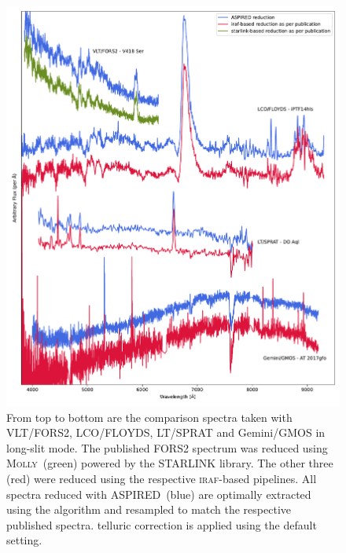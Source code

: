 \documentclass[linenumbers, twocolumn]{aastex631}
\begin{document}
\begin{figure}
    \centering
    \includegraphics[width=\textwidth]{fig_08_reduction_compared.pdf}
    \caption{From top to bottom are the comparison spectra taken with VLT/FORS2,
    LCO/FLOYDS, LT/SPRAT and Gemini/GMOS in long-slit mode. The published FORS2
    spectrum was reduced using \textsc{Molly}~(green) powered by the \textsc{STARLINK}
    library. The other three (red) were reduced using the respective \textsc{iraf}-based
    pipelines. All spectra reduced with \textsc{ASPIRED}~(blue) are optimally extracted using the \citep{1986PASP...98..609H} algorithm and resampled to match
    the respective published spectra. telluric correction is applied using the default
    setting.}
    \label{fig:reduction_compared}
\end{figure}
\end{document}
